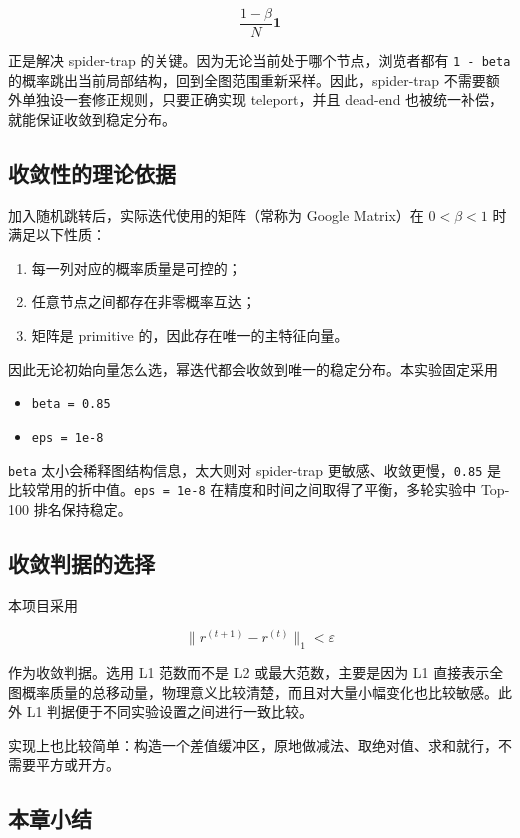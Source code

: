 \documentclass[UTF8,a4paper,12pt]{ctexart}
\begin{document}
\[ \frac{1-\beta}{N}\mathbf{1} \]


正是解决 spider-trap 的关键。因为无论当前处于哪个节点，浏览者都有 \texttt{1 - beta} 的概率跳出当前局部结构，回到全图范围重新采样。因此，spider-trap 不需要额外单独设一套修正规则，只要正确实现 teleport，并且 dead-end 也被统一补偿，就能保证收敛到稳定分布。


\subsection{收敛性的理论依据}


加入随机跳转后，实际迭代使用的矩阵（常称为 Google Matrix）在 $0 < \beta < 1$ 时满足以下性质：


\begin{enumerate}
\item 每一列对应的概率质量是可控的；
\item 任意节点之间都存在非零概率互达；
\item 矩阵是 primitive 的，因此存在唯一的主特征向量。
\end{enumerate}


因此无论初始向量怎么选，幂迭代都会收敛到唯一的稳定分布。本实验固定采用


\begin{itemize}
\item \texttt{beta = 0.85}
\item \texttt{eps = 1e-8}
\end{itemize}


\texttt{beta} 太小会稀释图结构信息，太大则对 spider-trap 更敏感、收敛更慢，\texttt{0.85} 是比较常用的折中值。\texttt{eps = 1e-8} 在精度和时间之间取得了平衡，多轮实验中 Top-100 排名保持稳定。


\subsection{收敛判据的选择}


本项目采用


\[ \lVert r^{(t+1)}-r^{(t)} \rVert_1 < \varepsilon \]


作为收敛判据。选用 L1 范数而不是 L2 或最大范数，主要是因为 L1 直接表示全图概率质量的总移动量，物理意义比较清楚，而且对大量小幅变化也比较敏感。此外 L1 判据便于不同实验设置之间进行一致比较。


实现上也比较简单：构造一个差值缓冲区，原地做减法、取绝对值、求和就行，不需要平方或开方。


\subsection{本章小结}
\end{document}
